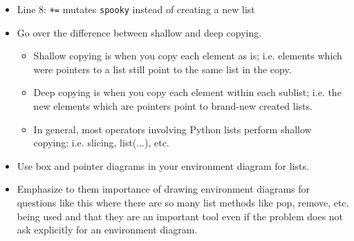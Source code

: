 \begin{blocksection}
\begin{guide}
\begin{itemize}
    \item Line 8: \lstinline{+=} mutates \lstinline{spooky} instead of creating a new list 
    \item Go over the difference between shallow and deep copying.
    \begin{itemize}
			\item Shallow copying is when you copy each element as is; i.e. elements which were pointers to a list still point to the same list in the copy.
			\item Deep copying is when you copy each element within each sublist; i.e. the new elements which are pointers point to brand-new created lists.
			\item In general, most operators involving Python lists perform shallow copying: i.e. slicing, list(...), etc. 
    \end{itemize}
    \item Use box and pointer diagrams in your environment diagram for lists.
    \item Emphasize to them importance of drawing environment diagrams for questions like this where there are so many list methods like pop, remove, etc. being used and that they are an important tool even if the problem does not ask explicitly for an environment diagram.
  \end{itemize}
\end{guide}
\end{blocksection}